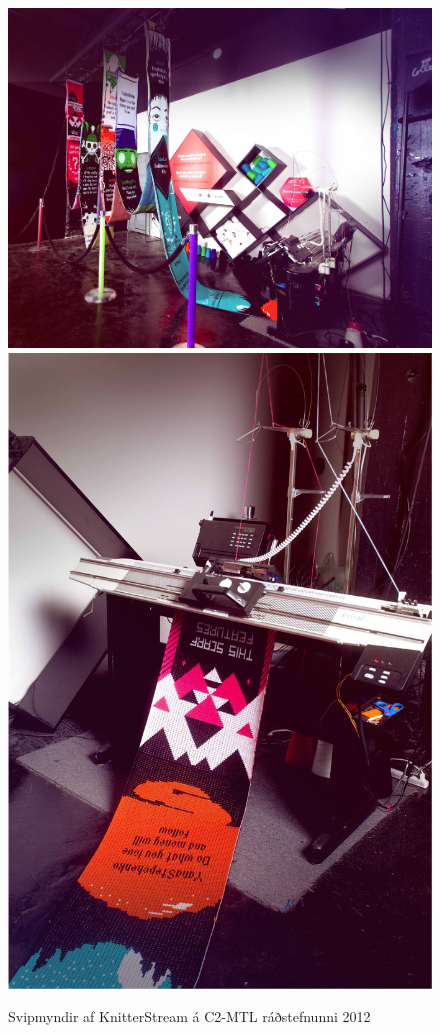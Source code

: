 \documentclass[a4paper,12pt,twoside]{article}
\begin{document}
\begin{figure}
    \centering
    \includegraphics[height=.3\textheight]{myndir/knitterstream_24.jpeg}
    \includegraphics[height=.3\textheight]{myndir/knitterstream_25.jpg}
    \caption{Svipmyndir af KnitterStream á C2-MTL ráðstefnunni 2012}
    \label{fig:knitterstream}
\end{figure}
\end{document}
